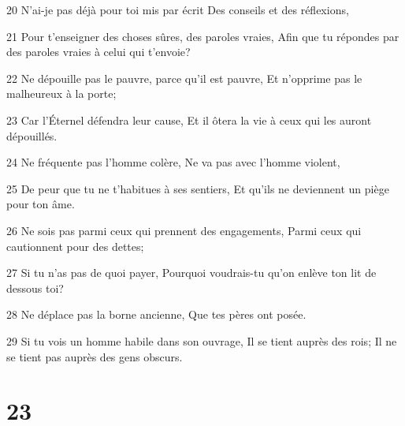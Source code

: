 \par 20 N'ai-je pas déjà pour toi mis par écrit Des conseils et des réflexions,
\par 21 Pour t'enseigner des choses sûres, des paroles vraies, Afin que tu répondes par des paroles vraies à celui qui t'envoie?
\par 22 Ne dépouille pas le pauvre, parce qu'il est pauvre, Et n'opprime pas le malheureux à la porte;
\par 23 Car l'Éternel défendra leur cause, Et il ôtera la vie à ceux qui les auront dépouillés.
\par 24 Ne fréquente pas l'homme colère, Ne va pas avec l'homme violent,
\par 25 De peur que tu ne t'habitues à ses sentiers, Et qu'ils ne deviennent un piège pour ton âme.
\par 26 Ne sois pas parmi ceux qui prennent des engagements, Parmi ceux qui cautionnent pour des dettes;
\par 27 Si tu n'as pas de quoi payer, Pourquoi voudrais-tu qu'on enlève ton lit de dessous toi?
\par 28 Ne déplace pas la borne ancienne, Que tes pères ont posée.
\par 29 Si tu vois un homme habile dans son ouvrage, Il se tient auprès des rois; Il ne se tient pas auprès des gens obscurs.

\chapter{23}

